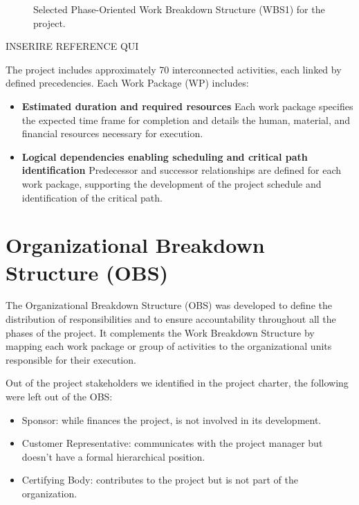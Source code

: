\documentclass[12pt]{article}
\begin{document}
\begin{figure}[p]
    \centering
    \caption{Selected Phase-Oriented Work Breakdown Structure (WBS1) for the project.}
    \label{fig:wbs1}
\end{figure}



INSERIRE REFERENCE QUI

The project includes approximately 70 interconnected activities, each linked by defined precedencies.
Each Work Package (WP) includes:
\begin{itemize}
        \item \textbf{Estimated duration and required resources}
              Each work package specifies the expected time frame for completion and details the human, material, and financial resources necessary for execution.
        \item \textbf{Logical dependencies enabling scheduling and critical path identification}
              Predecessor and successor relationships are defined for each work package, supporting the development of the project schedule and identification of the critical path.
\end{itemize}

\section{Organizational Breakdown Structure (OBS)}

The Organizational Breakdown Structure (OBS) was developed to define the distribution of responsibilities and to ensure accountability throughout all the phases of the project. It complements the Work Breakdown Structure by mapping each work package or group of activities to the organizational units responsible for their execution.

Out of the project stakeholders we identified in the project charter, the following were left out of the OBS:
\begin{itemize}
        \item Sponsor: while finances the project, is not involved in its development.
        \item Customer Representative: communicates with the project manager but doesn't have a formal hierarchical position.
        \item Certifying Body: contributes to the project but is not part of the organization.
\end{itemize}
\end{document}
